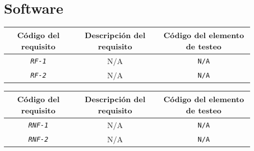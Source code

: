 \section{Software}

    \begin{center}
        \begin{tabular}{|| c | c | c ||} 
            \hline
            Código del requisito & Descripción del requisito & Código del elemento de testeo \\
            \hline\hline
            \texttt{\textit{RF-1}} & N/A & \texttt{N/A} \\ 
            \hline
            \texttt{\textit{RF-2}} & N/A & \texttt{N/A}  \\
            \hline
        \end{tabular}
    \end{center}
    
    \begin{center}
        \begin{tabular}{|| c | c | c ||} 
            \hline
            Código del requisito & Descripción del requisito & Código del elemento de testeo \\
            \hline\hline
            \texttt{\textit{RNF-1}} & N/A & \texttt{N/A} \\ 
            \hline
            \texttt{\textit{RNF-2}} & N/A & \texttt{N/A}  \\
            \hline
        \end{tabular}
    \end{center}

\newpage